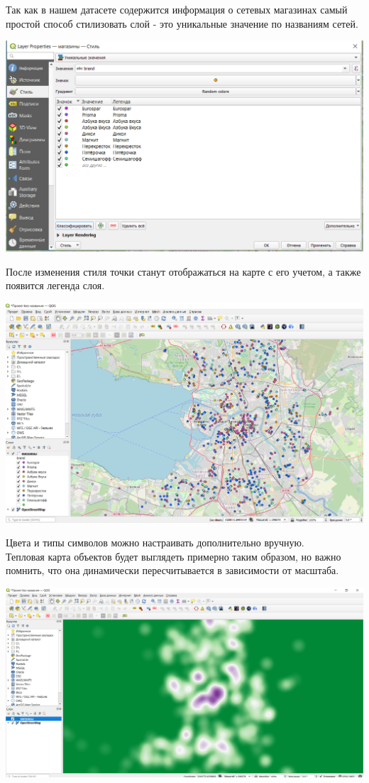 \documentclass[
]{book}
\begin{document}
Так как в нашем датасете содержится информация о сетевых магазинах самый простой способ стилизовать слой - это уникальные значение по названиям сетей.

\includegraphics{figures/10.PNG}

После изменения стиля точки станут отображаться на карте с его учетом, а также появится легенда слоя.

\includegraphics{figures/11.PNG}

Цвета и типы символов можно настраивать дополнительно вручную.\\
Тепловая карта объектов будет выглядеть примерно таким образом, но важно помнить, что она динамически пересчитывается в зависимости от масштаба.

\includegraphics{figures/12.PNG}
\end{document}
